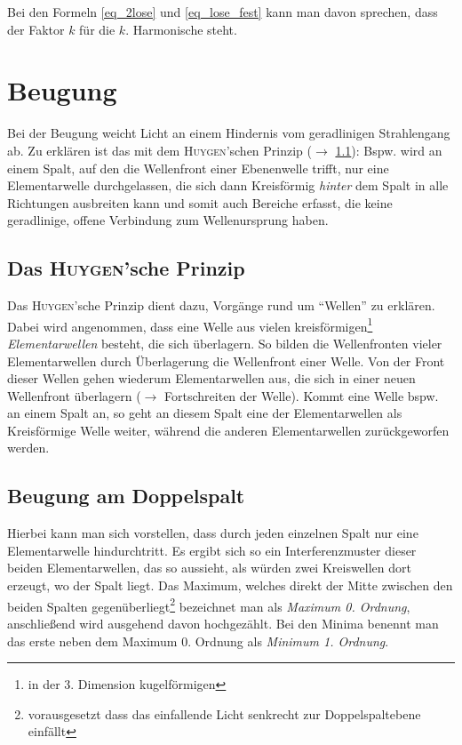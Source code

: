 Bei den Formeln \ref{eq_2lose} und \ref{eq_lose_fest} kann man davon sprechen, dass der Faktor \(k\) für die \(k\). Harmonische steht.





		 \chapter{Beugung}

Bei der Beugung weicht Licht an einem Hindernis vom geradlinigen Strahlengang ab. Zu erklären ist das mit dem \textsc{Huygen}'schen Prinzip (\(\rightarrow\) \ref{ss_huygensches prinzip}): Bspw. wird an einem Spalt, auf den die Wellenfront einer Ebenenwelle trifft, nur eine Elementarwelle durchgelassen, die sich dann Kreisförmig \emph{hinter} dem Spalt in alle Richtungen ausbreiten kann und somit auch Bereiche erfasst, die keine geradlinige, offene Verbindung zum Wellenursprung haben.

	\section{Das \textsc{Huygen}'sche Prinzip}
	\label{ss_huygensches prinzip}

Das \textsc{Huygen}'sche Prinzip dient dazu, Vorgänge rund um "`Wellen"' zu erklären. Dabei wird angenommen, dass eine Welle aus vielen kreisförmigen\footnote{in der 3. Dimension kugelförmigen} \emph{Elementarwellen} besteht, die sich überlagern. So bilden die Wellenfronten vieler Elementarwellen durch Überlagerung die Wellenfront einer Welle. Von der Front dieser Wellen gehen wiederum Elementarwellen aus, die sich in einer neuen Wellenfront überlagern (\(\rightarrow\) Fortschreiten der Welle). Kommt eine Welle bspw. an einem Spalt an, so geht an diesem Spalt eine der Elementarwellen als Kreisförmige Welle weiter, während die anderen Elementarwellen zurückgeworfen werden.






	\section{Beugung am Doppelspalt}
	\label{ss_beugung_doppelspalt}

Hierbei kann man sich vorstellen, dass durch jeden einzelnen Spalt nur eine Elementarwelle hindurchtritt. Es ergibt sich so ein Interferenzmuster dieser beiden Elementarwellen, das so aussieht, als würden zwei Kreiswellen dort erzeugt, wo der Spalt liegt. Das Maximum, welches direkt der Mitte zwischen den beiden Spalten gegenüberliegt\footnote{vorausgesetzt dass das einfallende Licht senkrecht zur Doppelspaltebene einfällt} bezeichnet man als \emph{Maximum 0. Ordnung}, anschließend wird ausgehend davon hochgezählt. Bei den Minima benennt man das erste neben dem Maximum 0. Ordnung als \emph{Minimum 1. Ordnung}.

